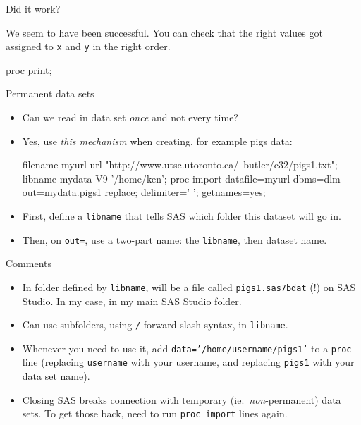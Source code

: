 \documentclass[unknownkeysallowed]{beamer}\usepackage[]{graphicx}\usepackage[]{color}
\begin{document}
\begin{frame}[fragile]{Did it work?}
  
      We seem to have been successful. You can check that the right values
  got assigned to \texttt{x} and \texttt{y} in the right order.

  
  \begin{Sascode}[store=mc]
proc print;    
  \end{Sascode}
  

\end{frame}

\begin{frame}[fragile]{Permanent data sets}
  \begin{itemize}
  \item Can we read in data set \emph{once} and not every time?
  \item Yes, use \emph{this mechanism} when creating, for
    example pigs data:

\begin{Datastep}
filename myurl url 
  "http://www.utsc.utoronto.ca/~butler/c32/pigs1.txt";  
libname mydata V9 '/home/ken';
proc import
  datafile=myurl
    dbms=dlm 
    out=mydata.pigs1
    replace;
  delimiter=' ';
  getnames=yes;
\end{Datastep}

\item First, define a \texttt{libname} that tells SAS which folder
  this dataset will go in.
\item Then, on \texttt{out=}, use a two-part name: the
  \texttt{libname}, then dataset name.


  \end{itemize}
\end{frame}

\begin{frame}[fragile]{Comments}
  \begin{itemize}
  \item In folder defined by \texttt{libname}, will be a file called
    \texttt{pigs1.sas7bdat} (!) on SAS Studio. In my case, in my main
    SAS Studio folder.
\item Can use subfolders, using \texttt{/} forward slash syntax, in
  \texttt{libname}. 

\item Whenever you need to use it, add
  \texttt{data='/home/username/pigs1'} to a \texttt{proc} line
  (replacing \texttt{username} with your username, and replacing
  \texttt{pigs1} with your data set name).
\item Closing SAS breaks connection with temporary (ie.\
  \emph{non}-permanent) data sets. To get those back, need to run
  \texttt{proc import} lines again. 

  \end{itemize}
\end{frame}
\end{document}
